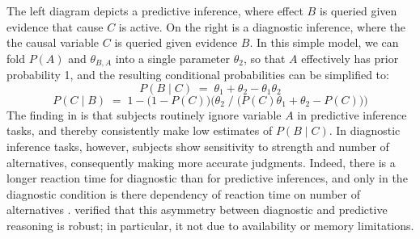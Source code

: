 \documentclass[10pt,letterpaper]{article}
\begin{document}
The left diagram depicts a predictive inference, where effect $B$ is queried given evidence that cause $C$ is active. On the right is a diagnostic inference, where the the causal variable $C$ is queried given evidence $B$. In this simple model, we can fold $P(A)$ and $\theta_{B,A}$ into a single parameter $\theta_2$, so that $A$ effectively has prior probability 1, and the resulting conditional probabilities can be simplified to: 
$$P(B\mid C) \;= \; \theta_1 + \theta_2 - \theta_1\theta_2$$
$$P(C \mid B) \;= \; 1- \big(1-P(C)\big)\Big(\theta_2\;/\;\big(P(C)\theta_1 + \theta_2  - P(C)\big)\Big)$$
The finding in \cite{Fernbach2011} is that subjects routinely ignore variable $A$ in predictive inference tasks, and thereby consistently make low estimates of $P(B\mid C)$. In diagnostic inference tasks, however, subjects show sensitivity to strength and number of alternatives, consequently making more accurate judgments. Indeed, there is a longer reaction time for diagnostic than for predictive inferences, and only in the diagnostic condition is there dependency of reaction time on number of alternatives \citep{Fernbach2010}. \cite{Fernbach2013} verified that this asymmetry between diagnostic and predictive reasoning is robust; in particular, it not due to availability or memory limitations.
\end{document}
